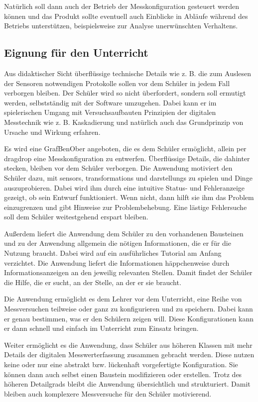 \documentclass[parskip=full]{scrartcl}
\begin{document}
Natürlich soll dann auch der Betrieb der Messkonfiguration gesteuert werden können und das Produkt sollte eventuell auch Einblicke in Abläufe während des Betriebs unterstützen, beispielsweise zur Analyse unerwünschten Verhaltens.

\subsection{Eignung für den Unterricht}

Aus didaktischer Sicht überflüssige technische Details wie z. B. die zum Auslesen der Sensoren notwendigen Protokolle sollen vor dem Schüler in jedem Fall verborgen bleiben.
Der Schüler wird so nicht überfordert, sondern soll ermutigt werden, selbstständig mit der Software umzugehen. 
Dabei kann er im spielerischen Umgang mit Versuchsaufbauten Prinzipien der digitalen Messtechnik wie z. B. Kaskadierung und natürlich auch das Grundprinzip von Ursache und Wirkung erfahren.

Es wird eine \gls{GrafBenOber} angeboten, die es dem Schüler ermöglicht, allein per \gls{dragdrop} eine Messkonfiguration zu entwerfen. 
Überflüssige Details, die dahinter stecken, bleiben vor dem Schüler verborgen.
Die Anwendung motiviert den Schüler dazu, mit \glspl{sensor}, \glspl{transformation} und \glspl{darstellung} zu spielen und Dinge auszuprobieren. 
Dabei wird ihm durch eine intuitive Status- und Fehleranzeige gezeigt, ob sein Entwurf funktioniert. 
Wenn nicht, dann hilft sie ihm das Problem einzugrenzen und gibt Hinweise zur Problembehebung. 
Eine lästige Fehlersuche soll dem Schüler weitestgehend erspart bleiben. 

Außerdem liefert die Anwendung dem Schüler zu den vorhandenen Bausteinen und zu der Anwendung allgemein die nötigen Informationen, die er für die Nutzung braucht. Dabei wird auf ein ausführliches Tutorial am Anfang verzichtet. Die Anwendung liefert die Informationen häppchenweise durch Informationsanzeigen an den jeweilig relevanten Stellen. Damit findet der Schüler die Hilfe, die er sucht, an der Stelle, an der er sie braucht.

Die Anwendung ermöglicht es dem Lehrer vor dem Unterricht, eine Reihe von Messversuchen teilweise oder ganz zu konfigurieren und zu speichern. Dabei kann er genau bestimmen, was er den Schülern zeigen will. Diese Konfigurationen kann er dann schnell und einfach im Unterricht zum Einsatz bringen. 

Weiter ermöglicht es die Anwendung, dass Schüler aus höheren Klassen mit mehr Details der digitalen Messwerterfassung zusammen gebracht werden. Diese nutzen keine oder nur eine abstrakt bzw. lückenhaft vorgefertigte Konfiguration. Sie können dann auch selbst einen Baustein modifizieren oder erstellen. Trotz des höheren Detailgrads bleibt die Anwendung übersichtlich und strukturiert. Damit bleiben auch komplexere Messversuche für den Schüler motivierend. 
\end{document}
